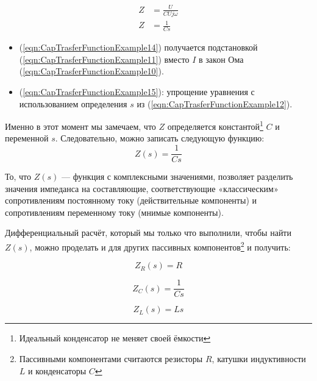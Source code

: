 \documentclass[a4paper, 10pt, final]{article} %
\begin{document}
    \begin{align}
        Z &= \frac{U}{C U j \omega} \label{eqn:CapTrasferFunctionExample14} \\
        Z &= \frac{1}{C s} \label{eqn:CapTrasferFunctionExample15}
    \end{align}
    \begin{itemize}
        \item (\ref{eqn:CapTrasferFunctionExample14}) получается подстановкой (\ref{eqn:CapTrasferFunctionExample11}) вместо $I$ в закон Ома (\ref{eqn:CapTrasferFunctionExample10}).
        \item (\ref{eqn:CapTrasferFunctionExample15}): упрощение уравнения с использованием определения $s$ из (\ref{eqn:CapTrasferFunctionExample12}).
    \end{itemize}
    \noindent Именно в этот момент мы замечаем, что $Z$ определяется константой\footnote{Идеальный конденсатор не меняет своей ёмкости} $C$ и переменной $s$.
    Следовательно, можно записать следующую функцию:
    \begin{equation} \label{eqn:CapTrasferFunctionExample16}
        Z(s) = \frac{1}{C s}
    \end{equation}

    \noindent То, что $Z(s)$ --- функция с комплексными значениями, позволяет разделить значения импеданса на составляющие, соответствующие «классическим» сопротивлениям постоянному току (действительные компоненты) и сопротивлениям переменному току (мнимые компоненты).

    Дифференциальный расчёт, который мы только что выполнили, чтобы найти $Z(s)$, можно проделать и для других пассивных компонентов\footnote{Пассивными компонентами считаются резисторы $R$, катушки индуктивности $L$ и конденсаторы $C$} и получить:
    \begin{figure}[H]
        \centering
        \begin{minipage}[b]{.3\linewidth}
            \centering
            \begin{equation*}
                Z_R(s)=R
            \end{equation*}
        \end{minipage}
        \hspace{0.04\linewidth}
        \begin{minipage}[b]{.3\linewidth}
            \centering
            \begin{equation*}
                Z_C(s) = \frac{1}{C s}
            \end{equation*}
        \end{minipage}
        \hspace*{0.04\linewidth}
        \begin{minipage}[b]{.3\linewidth}
            \centering
            \begin{equation*}
                Z_L(s) = {L s}
            \end{equation*}
        \end{minipage}
    \end{figure}
    
\end{document}
